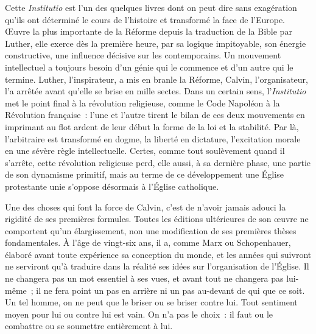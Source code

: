 \documentclass[french,twoside]{book} %
\newcommand{\astermono}{\medskip\centerline{\color{rubric}\large\selectfont{\syms ✻}}\medskip\par}%
\begin{document}
Cette \emph{Institutio} est l’un des quelques livres dont on peut dire sans exagération qu’ils ont déterminé le cours de l’histoire et transformé la face de l’Europe. Œuvre la plus importante de la Réforme depuis la traduction de la Bible par Luther, elle exerce dès la première heure, par sa logique impitoyable, son énergie constructive, une influence décisive sur les contemporains. Un mouvement intellectuel a toujours besoin d’un génie qui le commence et d’un autre qui le termine. Luther, l’inspirateur, a mis en branle la Réforme, Calvin, l’organisateur, l’a arrêtée avant qu’elle se brise en mille sectes. Dans un certain sens, l’\emph{Institutio} met le point final à la révolution religieuse, comme le Code Napoléon à la Révolution française : l’une et l’autre tirent le bilan de ces deux mouvements en imprimant au flot ardent de leur début la forme de la loi et la stabilité. Par là, l’arbitraire est transformé en dogme, la liberté en dictature, l’excitation morale en une sévère règle intellectuelle. Certes, comme tout soulèvement quand il s’arrête, cette révolution religieuse perd, elle aussi, à sa dernière phase, une partie de son dynamisme primitif, mais au terme de ce développement une Église protestante unie s’oppose désormais à l’Église catholique.\par
Une des choses qui font la force de Calvin, c’est de n’avoir jamais adouci la rigidité de ses premières formules. Toutes les éditions ultérieures de son œuvre ne comportent qu’un élargissement, non une modification de ses premières thèses fondamentales. À l’âge de vingt-six ans, il a, comme Marx ou Schopenhauer, élaboré avant toute expérience sa conception du monde, et les années qui suivront ne serviront qu’à traduire dans la réalité ses idées sur l’organisation de l’Église. Il ne changera pas un mot essentiel à ses vues, et avant tout ne changera pas lui-même ; il ne fera point un pas en arrière ni un pas au-devant de qui que ce soit. Un tel homme, on ne peut que le briser ou se briser contre lui. Tout sentiment moyen pour lui ou contre lui est vain. On n’a pas le choix : il faut ou le combattre ou se soumettre entièrement à lui.\par

\astermono
\end{document}
